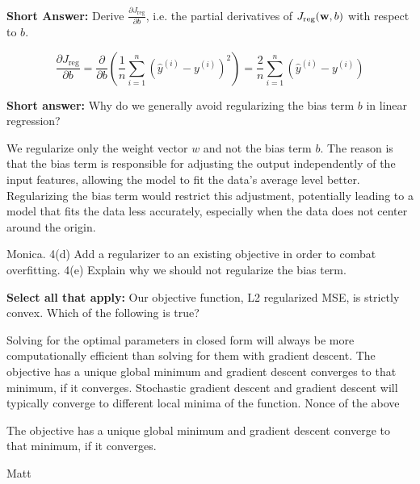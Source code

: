 \begin{parts}
\begin{subparts}
\begin{soln}
    \end{soln}

\subpart[2] \textbf{Short Answer:} Derive \( \frac{\partial J_{\text{reg}}}{\partial b} \), i.e. the partial derivatives of \( J_{\text{reg}}(\mathbf{w}, b) \) with respect to \( b \).

    \begin{tcolorbox}[fit,height=5cm, width=15cm, blank, borderline={1pt}{-2pt},nobeforeafter]
    \end{tcolorbox}

    \begin{soln}
    \[
    \frac{\partial J_{\text{reg}}}{\partial b} = \frac{\partial}{\partial b} \left( \frac{1}{n} \sum_{i=1}^{n} (\hat{y}^{(i)} - y^{(i)})^2 \right) = \frac{2}{n} \sum_{i=1}^{n} (\hat{y}^{(i)} - y^{(i)})
    \]
    \end{soln}

\clearpage

\subpart[2] \textbf{Short answer:} Why do we generally avoid regularizing the bias term $b$ in linear regression?
    \fillwithlines{8em}
    \begin{soln}
    We regularize only the weight vector \( w \) and not the bias term \( b \). The reason is that the bias term is responsible for adjusting the output independently of the input features, allowing the model to fit the data's average level better. Regularizing the bias term would restrict this adjustment, potentially leading to a model that fits the data less accurately, especially when the data does not center around the origin. 
    \end{soln}
    
    \begin{qauthor}
    Monica. 4(d) Add a regularizer to an existing objective in order to combat overfitting. 4(e) Explain why we should not regularize the bias term.
    \end{qauthor}

    
\subpart[2] \textbf{Select all that apply:} Our objective function, L2 regularized MSE, is strictly convex. Which of the following is true?
    \begin{checkboxessquare}
     \choice Solving for the optimal parameters in closed form will always be more computationally efficient than solving for them with gradient descent.
     \choice The objective has a unique global minimum and gradient descent converges to that minimum, if it converges.
     \choice Stochastic gradient descent and gradient descent will typically converge to different local minima of the function.
     \choice Nonce of the above
    \end{checkboxessquare}
    \begin{soln}
    The objective has a unique global minimum and gradient descent converge to that minimum, if it converges.
    \end{soln}
    \begin{qauthor}
    Matt
    \end{qauthor}
    

\end{subparts}



\end{parts}